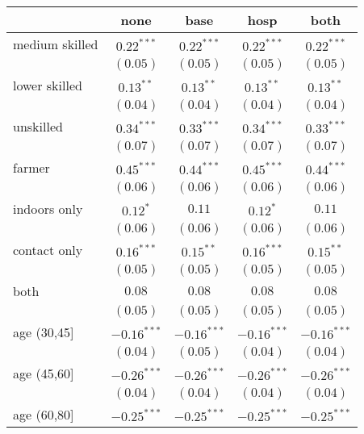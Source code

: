 
\begin{table}[h!]
\begin{center}
\begin{small}
\begin{tabular}{l c c c c}
\hline
 & none & base & hosp & both \\
\hline
medium skilled     & $0.22^{***}$  & $0.22^{***}$  & $0.22^{***}$  & $0.22^{***}$  \\
                   & $(0.05)$      & $(0.05)$      & $(0.05)$      & $(0.05)$      \\
lower skilled      & $0.13^{**}$   & $0.13^{**}$   & $0.13^{**}$   & $0.13^{**}$   \\
                   & $(0.04)$      & $(0.04)$      & $(0.04)$      & $(0.04)$      \\
unskilled          & $0.34^{***}$  & $0.33^{***}$  & $0.34^{***}$  & $0.33^{***}$  \\
                   & $(0.07)$      & $(0.07)$      & $(0.07)$      & $(0.07)$      \\
farmer             & $0.45^{***}$  & $0.44^{***}$  & $0.45^{***}$  & $0.44^{***}$  \\
                   & $(0.06)$      & $(0.06)$      & $(0.06)$      & $(0.06)$      \\
indoors only       & $0.12^{*}$    & $0.11$        & $0.12^{*}$    & $0.11$        \\
                   & $(0.06)$      & $(0.06)$      & $(0.06)$      & $(0.06)$      \\
contact only       & $0.16^{***}$  & $0.15^{**}$   & $0.16^{***}$  & $0.15^{**}$   \\
                   & $(0.05)$      & $(0.05)$      & $(0.05)$      & $(0.05)$      \\
both               & $0.08$        & $0.08$        & $0.08$        & $0.08$        \\
                   & $(0.05)$      & $(0.05)$      & $(0.05)$      & $(0.05)$      \\
age (30,45]        & $-0.16^{***}$ & $-0.16^{***}$ & $-0.16^{***}$ & $-0.16^{***}$ \\
                   & $(0.04)$      & $(0.05)$      & $(0.04)$      & $(0.04)$      \\
age (45,60]        & $-0.26^{***}$ & $-0.26^{***}$ & $-0.26^{***}$ & $-0.26^{***}$ \\
                   & $(0.04)$      & $(0.04)$      & $(0.04)$      & $(0.04)$      \\
age (60,80]        & $-0.25^{***}$ & $-0.25^{***}$ & $-0.25^{***}$ & $-0.25^{***}$ \\

\end{tabular}
\end{small}
\end{center}
\end{table}

